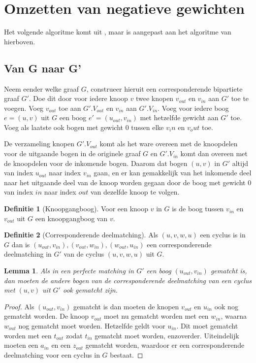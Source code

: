 \documentclass[conference]{IEEEtran}
\newtheorem{lemma}{Lemma}[section]
\theoremstyle{definition}
\newtheorem{definition}{Definitie}[section]
\theoremstyle{remark}
\newcommand{\vin}{_{in}}
\newcommand{\vout}{_{out}}
\begin{document}
\section{Omzetten van negatieve gewichten}
Het volgende algoritme komt uit \cite{Scaling}, maar is aangepast aan het algoritme van hierboven.

\subsection{Van G naar G'}
Neem eender welke graaf $G$, construeer hieruit een corresponderende bipartiete graaf $G'$. Doe dit door voor iedere knoop $v$ twee knopen $v_{out}$ en $v_{in}$ aan $G'$ toe te voegen. Voeg $v_{out}$ toe aan $G'.V_{out}$ en $v_{in}$ aan $G'.V_{in}$. Voeg voor iedere boog $e = (u, v)$ uit $G$ een boog $e' = (u_{out}, v_{in})$ met hetzelfde gewicht aan $G'$ toe. Voeg als laatste ook bogen met gewicht $0$ tussen elke $v_in$ en $v_out$ toe.

De verzameling knopen $G'.V_{out}$ komt als het ware overeen met de knoopdelen voor de uitgaande bogen in de originele graaf $G$ en $G'.V_{in}$ komt dan overeen met de knoopdelen voor de inkomende bogen. Daarom dat bogen $(u, v)$ in $G'$ altijd van index $u_{out}$ naar index $v_{in}$ gaan, en er kan gemakkelijk van het inkomende deel naar het uitgaande deel van de knoop worden gegaan door de boog met gewicht $0$ van index $in$ naar index $out$ van dezelfde knoop te volgen.

\begin{definition}[Knoopgangboog]
    Voor een knoop $v$ in $G$ is de boog tussen $v_{in}$ en $v_{out}$ uit $G$ een knoopgangboog van $v$.
\end{definition}

\begin{definition}[Corresponderende deelmatching]
    Als $(u, v, w, u)$ een cyclus is in $G$ dan is ${(u_{out}, v_{in}), (v_{out}, w_{in}), (w_{out}, u_{in})}$ een corresponderende deelmatching in $G'$ van de cyclus $(u, v, w, u)$ uit $G$.
\end{definition}

\begin{lemma}
    Als in een perfecte matching in $G'$ een boog $(u_{out}, v_{in})$ gematcht is, dan moeten de andere bogen van de corresponderende deelmatching van een cyclus met $(u, v)$ uit $G'$ ook gematcht zijn.
\end{lemma}
\begin{proof}
    Als $(u\vout,  v\vin)$ gematcht is dan moeten de knopen $v\vout$ en $u\vin$ ook nog gematcht worden. De knoop $v\vout$ moet nu gematcht worden met een $w\vin$, waarna $w\vout$ nog gematcht moet worden. Hetzelfde geldt voor $u\vin$. Dit moet gematcht worden met een $t\vout$ zodat $t\vin$ gematcht moet worden, enzoverder. Uiteindelijk moeten een $a\vin$ en een $z\vout$ gematcht worden, waardoor er een corresponderende deelmatching voor een cyclus in $G$ bestaat.
\end{proof}
\end{document}
